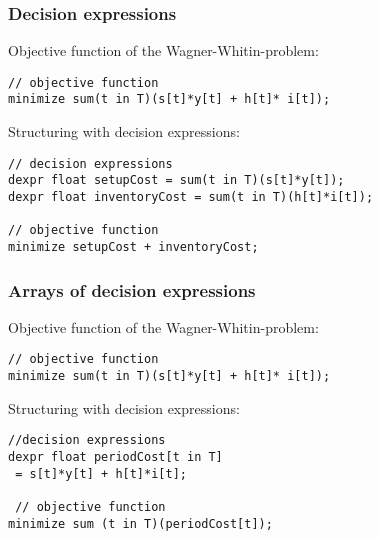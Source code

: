 \begin{frame}[fragile]
 \frametitle{Decision expressions}
 Objective function of the Wagner-Whitin-problem:
\begin{lstlisting}[numbers=none,basicstyle=\scriptsize\ttfamily]
// objective function
minimize sum(t in T)(s[t]*y[t] + h[t]* i[t]);
\end{lstlisting}

Structuring with decision expressions:
\begin{lstlisting}[numbers=none,basicstyle=\scriptsize\ttfamily]
// decision expressions
dexpr float setupCost = sum(t in T)(s[t]*y[t]);
dexpr float inventoryCost = sum(t in T)(h[t]*i[t]);

// objective function
minimize setupCost + inventoryCost;
\end{lstlisting}
\end{frame}

\begin{frame}[fragile]
 \frametitle{Arrays of decision expressions}
 Objective function of the Wagner-Whitin-problem:
\begin{lstlisting}[numbers=none,basicstyle=\scriptsize\ttfamily]
// objective function
minimize sum(t in T)(s[t]*y[t] + h[t]* i[t]);
\end{lstlisting}

Structuring with decision expressions:
\begin{lstlisting}[numbers=none,basicstyle=\scriptsize\ttfamily]
//decision expressions
dexpr float periodCost[t in T] 
 = s[t]*y[t] + h[t]*i[t];

 // objective function
minimize sum (t in T)(periodCost[t]);
\end{lstlisting}
\end{frame}

